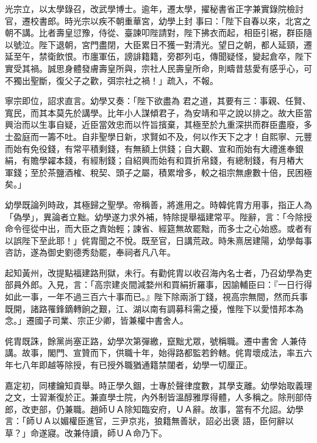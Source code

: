 \begin{pinyinscope}
 光宗立，以太學錄召，改武學博士。逾年，遷太學，擢秘書省正字兼實錄院檢討官，遷校書郎。時光宗以疾不朝重華宮，幼學上封
 事曰：「陛下自春以來，北宮之朝不講。比者壽皇愆豫，侍從、臺諫叩陛請對，陛下拂衣而起，相臣引裾，群臣隨以號泣。陛下退朝，宮門盡閉，大臣累日不獲一對清光。望日之朝，都人延頸，遷延至午，禁衛飲恨。市廛軍伍，謗誹籍籍，旁郡列屯，傳聞疑怪，變起倉卒，陛下實受其禍。誠思身體發膚壽皇所與，宗社人民壽皇所命，則疇昔慈愛有感乎心，可不獨出聖斷，復父子之歡，弭宗社之禍！」疏入，不報。



 寧宗即位，詔求直言。幼學又奏：「陛下欲盡為
 君之道，其要有三：事親、任賢、寬民，而其本莫先於講學。比年小人謀傾君子，為安靖和平之說以排之。故大臣當興治而以生事自疑，近臣當效忠而以忤旨擯棄，其極至於九重深拱而群臣盡廢，多士盈庭而一籌不吐。自非聖學日新，求賢如不及，何以作天下之才！自熙寧、元豐而始有免役錢，有常平積剩錢，有無額上供錢；自大觀、宣和而始有大禮進奉銀絹，有贍學糴本錢，有經制錢；自紹興而始有和買折帛錢，有總制錢，有月樁大
 軍錢；至於茶鹽酒榷、稅契、頭子之屬，積累增多，較之祖宗無慮數十倍，民困極矣。」



 幼學既論列時政，其極歸之聖學。帝稱善，將進用之。時韓侂胄方用事，指正人為「偽學」，異論者立黜。幼學遂力求外補，特除提舉福建常平。陛辭，言：「今除授命令徑從中出，而大臣之責始輕；諫省、經筵無故罷黜，而多士之心始惑。或者有以誤陛下至此耶！」侂胄聞之不悅。既至官，日講荒政。時朱熹居建陽，幼學每事咨訪，遂為御史劉德秀劾罷，奉祠者凡八年。



 起知黃州，改提點福建路刑獄，未行。有勸侂胄以收召海內名士者，乃召幼學為吏部員外郎。入見，言：「高宗建炎間減婺州和買絹折羅事，因諭輔臣曰：『一日行得如此一事，一年不過三百六十事而已。』陛下除兩浙丁錢，視高宗無間，然而兵事既開，諸路罹鋒鏑轉餉之艱，江、湖以南有調募科需之擾，惟陛下以愛惜邦本為念。」遷國子司業、宗正少卿，皆兼權中書舍人。



 侂胄既誅，餘黨尚塞正路，幼學次第彈繳，竄黜尤眾，號稱職。遷中書舍
 人兼侍講。故事，閣門、宣贊而下，供職十年，始得路都監若鈐轄。侂胄壞成法，率五六年七八年即越等除授，有已授外職猶通籍禁闥者，幼學一切厘正。



 嘉定初，同樓鑰知貢舉。時正學久錮，士專於聲律度數，其學支離。幼學始取義理之文，士習漸復於正。兼直學士院，內外制皆溫醇雅厚得體，人多稱之。除刑部侍郎，改吏部，仍兼職。趙師ＵＡ除知臨安府，ＵＡ辭。故事，當有不允詔。幼學言：「師ＵＡ以媚權臣進官，三尹京兆，狼籍無善狀，詔必出褒
 語，臣何辭以草？」命遂寢。改兼侍讀，師ＵＡ命乃下。




\end{pinyinscope}
